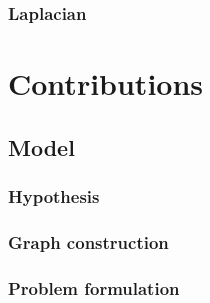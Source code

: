 \documentclass[a4paper,12pt,twoside]{report}
\begin{document}
\section{Laplacian}

\part{Contributions}
\label{contributions}

\chapter{Model}

\section{Hypothesis}




\section{Graph construction}

\section{Problem formulation}
\end{document}
